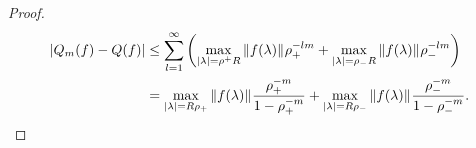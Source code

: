 \begin{proof}
    \begin{align*}
        |Q_m(f) - Q(f)|
        &\leq
        \sum_{l=1}^\infty
            {\left ( 
                \max_{|\lambda| = \rho^+R}
                    {\left \| f(\lambda) \right \|}_{}
                    \rho_+^{-l m}
                +
                \max_{|\lambda| = \rho_-R}
                    {\left \| f(\lambda) \right \|}_{}
                    \rho_-^{-l m}
             \right )} \\
        &=
        \max_{{\left | \lambda \right |} = R \rho_+}
            {\left \| f(\lambda) \right \|}_{}
        \frac{\rho_+^{-m}}{1 - \rho_+^{-m}}
        +
        \max_{{\left | \lambda \right |} = R \rho_-}
            {\left \| f(\lambda) \right \|}_{}
        \frac{\rho_-^{-m}}{1 - \rho_-^{-m}}.
    \end{align*}

\end{proof}
